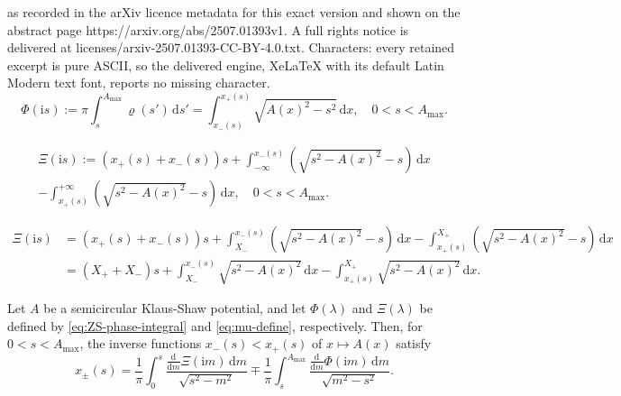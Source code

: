 \documentclass[10pt,a4paper]{amsart}
\newcommand{\dd}{\mathrm{d}}
\newcommand{\evdensity}{\varrho}
\newcommand{\ii}{\mathrm{i}}
\newcommand{\phaseint}{\Phi}
\newcommand{\tailint}{\Xi}
\begin{document}
as recorded in the arXiv licence metadata for this exact version and shown on the abstract page https://arxiv.org/abs/2507.01393v1. A full rights notice is delivered at licenses/arxiv-2507.01393-CC-BY-4.0.txt. Characters: every retained excerpt is pure ASCII, so the delivered engine, XeLaTeX with its default Latin Modern text font, reports no missing character.
\begin{equation}
\phaseint(\ii s):=\pi\int_{s}^{A_\mathrm{max}}\evdensity(s')\,\dd s'= \int_{x_-(s)}^{x_+(s)}\sqrt{A(x)^2-s^2}\,\dd x,\quad 0<s<A_\mathrm{max}.
\label{eq:ZS-phase-integral}
\end{equation}

\begin{multline}
\tailint(\ii s):=(x_+(s)+x_-(s))s + \int_{-\infty}^{x_-(s)}\left(\sqrt{s^2-A(x)^2}-s\right)\,\dd x \\
   - \int_{x_+(s)}^{+\infty}\left(\sqrt{s^2-A(x)^2}-s\right)\,\dd x,\quad 0<s<A_\mathrm{max}.
\label{eq:mu-define}
\end{multline}

\begin{align}
\tailint(\ii s)&=(x_+(s)+x_-(s))s + \int_{X_-}^{x_-(s)}\left(\sqrt{s^2-A(x)^2}-s\right)\,\dd x -\int_{x_+(s)}^{X_+}\left(\sqrt{s^2-A(x)^2}-s\right)\,\dd x\nonumber \\
&=(X_++X_-)s + \int_{X_-}^{x_-(s)}\sqrt{s^2-A(x)^2}\,\dd x -\int_{x_+(s)}^{X_+}\sqrt{s^2-A(x)^2}\,\dd x.
\label{eq:mu-rewrite}
\end{align}

\begin{prop}
Let $A$ be a semicircular Klaus-Shaw potential, and let $\phaseint(\lambda)$ and $\tailint(\lambda)$ be defined by \eqref{eq:ZS-phase-integral} and \eqref{eq:mu-define}, respectively. Then, for $0<s<A_\mathrm{max}$, the inverse functions $x_-(s)<x_+(s)$ of $x\mapsto A(x)$ satisfy
\begin{equation}
x_\pm(s)=\frac{1}{\pi}\int_0^s\frac{\displaystyle\frac{\dd}{\dd m}\tailint(\ii m)\,\dd m}{\sqrt{s^2-m^2}}\mp\frac{1}{\pi}\int_s^{A_\mathrm{max}}\frac{\displaystyle\frac{\dd}{\dd m}\phaseint(\ii m)\,\dd m}{\sqrt{m^2-s^2}}.
\label{eq:xpm-recover}
\end{equation}
\label{prop:Psi-mu-invert}
\end{prop}
\end{document}
